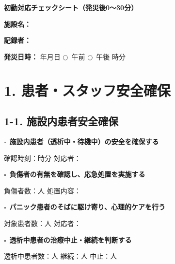 \documentclass[a4paper,12pt]{jarticle}
\newcommand{\checkbox}{$\square$\ }
\newcommand{\underlinespace}[1]{\underline{\hspace{#1}}}
\newcommand{\circlecheck}{$\bigcirc$\ }
\begin{document}
\begin{center}
{\Large\textbf{初動対応チェックシート（発災後0～30分）}}
\end{center}
\vspace{5mm}

\noindent
\textbf{施設名：} \underlinespace{8cm}

\vspace{3mm}

\noindent
\textbf{記録者：} \underlinespace{4cm}

\vspace{3mm}

\noindent
\textbf{発災日時：} \underlinespace{2cm}年\underlinespace{1cm}月\underlinespace{1cm}日 \quad \circlecheck 午前 \quad \circlecheck 午後 \quad \underlinespace{1cm}時\underlinespace{1cm}分

\vspace{5mm}

\section*{1. 患者・スタッフ安全確保}

\subsection*{1-1. 施設内患者安全確保}

\checkbox \textbf{施設内患者（透析中・待機中）の安全を確保する}

\quad 確認時刻：\underlinespace{1cm}時\underlinespace{1cm}分 \quad 対応者：\underlinespace{4cm}

\vspace{3mm}

\checkbox \textbf{負傷者の有無を確認し、応急処置を実施する}

\quad 負傷者数：\underlinespace{2cm}人 \quad 処置内容：\underlinespace{6cm}

\vspace{3mm}

\checkbox \textbf{パニック患者のそばに駆け寄り、心理的ケアを行う}

\quad 対象患者数：\underlinespace{2cm}人 \quad 対応者：\underlinespace{4cm}

\vspace{3mm}

\checkbox \textbf{透析中患者の治療中止・継続を判断する}

\quad 透析中患者数：\underlinespace{2cm}人 \quad 継続：\underlinespace{2cm}人 \quad 中止：\underlinespace{2cm}人
\end{document}
